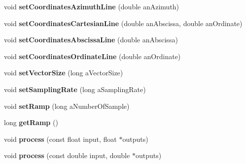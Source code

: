 \begin{DoxyCompactItemize}
\item 
\hypertarget{class_ambisonic_map_aff1eec7d1bd6b06ab1d3d06e4ff27a94}{void {\bfseries set\-Coordinates\-Azimuth\-Line} (double an\-Azimuth)}\label{class_ambisonic_map_aff1eec7d1bd6b06ab1d3d06e4ff27a94}

\item 
\hypertarget{class_ambisonic_map_afe51515264b6e6823578f12ee8b0c03b}{void {\bfseries set\-Coordinates\-Cartesian\-Line} (double an\-Abscissa, double an\-Ordinate)}\label{class_ambisonic_map_afe51515264b6e6823578f12ee8b0c03b}

\item 
\hypertarget{class_ambisonic_map_aa762fa8f208f78c81231d2f5dad681d9}{void {\bfseries set\-Coordinates\-Abscissa\-Line} (double an\-Abscissa)}\label{class_ambisonic_map_aa762fa8f208f78c81231d2f5dad681d9}

\item 
\hypertarget{class_ambisonic_map_ab39c3105350c0e6c8399300d70a0b6ae}{void {\bfseries set\-Coordinates\-Ordinate\-Line} (double an\-Ordinate)}\label{class_ambisonic_map_ab39c3105350c0e6c8399300d70a0b6ae}

\item 
\hypertarget{class_ambisonic_map_a3d4cf14a86809505e4c11786faccecba}{void {\bfseries set\-Vector\-Size} (long a\-Vector\-Size)}\label{class_ambisonic_map_a3d4cf14a86809505e4c11786faccecba}

\item 
\hypertarget{class_ambisonic_map_aa275b5cfa4248ea84fd0e5c2da4e113c}{void {\bfseries set\-Sampling\-Rate} (long a\-Sampling\-Rate)}\label{class_ambisonic_map_aa275b5cfa4248ea84fd0e5c2da4e113c}

\item 
\hypertarget{class_ambisonic_map_a8628af240a10fe0c8ed455cf737a3f4e}{void {\bfseries set\-Ramp} (long a\-Number\-Of\-Sample)}\label{class_ambisonic_map_a8628af240a10fe0c8ed455cf737a3f4e}

\item 
\hypertarget{class_ambisonic_map_acd8abbb3ec6aa11bf0073882e3e1dd09}{long {\bfseries get\-Ramp} ()}\label{class_ambisonic_map_acd8abbb3ec6aa11bf0073882e3e1dd09}

\item 
\hypertarget{class_ambisonic_map_a0fc90adbab2ae9c07a86e1a45890f7ec}{void {\bfseries process} (const float input, float $\ast$outputs)}\label{class_ambisonic_map_a0fc90adbab2ae9c07a86e1a45890f7ec}

\item 
\hypertarget{class_ambisonic_map_a54e22a72aa5f5e248aa41e4880ce8cbd}{void {\bfseries process} (const double input, double $\ast$outputs)}\label{class_ambisonic_map_a54e22a72aa5f5e248aa41e4880ce8cbd}


\end{DoxyCompactItemize}
